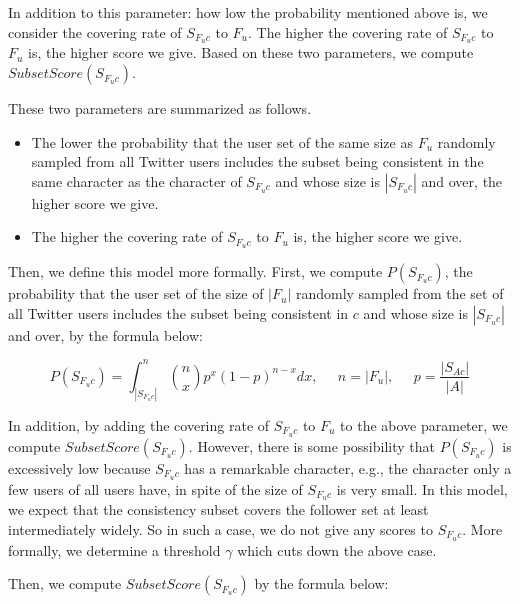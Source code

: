 In addition to this parameter: how low the probability mentioned above
is, we consider the covering rate of $S_{F_uc}$ to $F_u$.  The higher
the covering rate of $S_{F_uc}$ to $F_u$ is, the higher score we give.
Based on these two parameters, we compute $\mathit{SubsetScore(S_{F_uc})}$.

These two parameters are summarized as follows.
\begin{itemize}
\item The lower the probability that the user set of the same size as $F_u$
randomly sampled from all Twitter users includes the subset
being consistent in the same character as the character of $S_{F_uc}$
and whose size is $|S_{F_uc}|$ and over, the higher score we give.
\item The higher the covering rate of $S_{F_uc}$ to $F_u$ is, the higher
      score we give.
\end{itemize}

Then, we define this model more formally.  First, we compute
$P(S_{F_uc})$, the probability that the user set of the size of $|F_u|$
randomly sampled from the set of all Twitter users includes the subset
being consistent in $c$ and whose size is $|S_{F_uc}|$ and over, by the
formula below:

\vspace{-1ex}
\[
 P(S_{F_uc}) = \int_{|S_{F_uc}|}^{n} \binom{n}{x} p^x (1-p)^{n - x}
 dx,\;\;\;\;\;n = |F_u|,\;\;\;\;\;p = \frac{|S_{Ac}|}{|A|}
\]
\vspace{-2ex}


In addition, by adding the covering rate of $S_{F_uc}$ to $F_u$ to the
above parameter, we compute $\mathit{SubsetScore(S_{F_uc})}$.  However,
there is some possibility that $P(S_{F_uc})$ is excessively low because
$S_{F_uc}$ has a remarkable character, e.g., the character only a few
users of all users have, in spite of the size of $S_{F_uc}$ is very
small.  In this model, we expect that the consistency subset covers the
follower set at least intermediately widely.  So in such a case, we do
not give any scores to $S_{F_uc}$.  More formally, we determine a
threshold $\gamma$ which cuts down the above case.

Then, we compute $\mathit{SubsetScore(S_{F_uc})}$ by the formula below:

